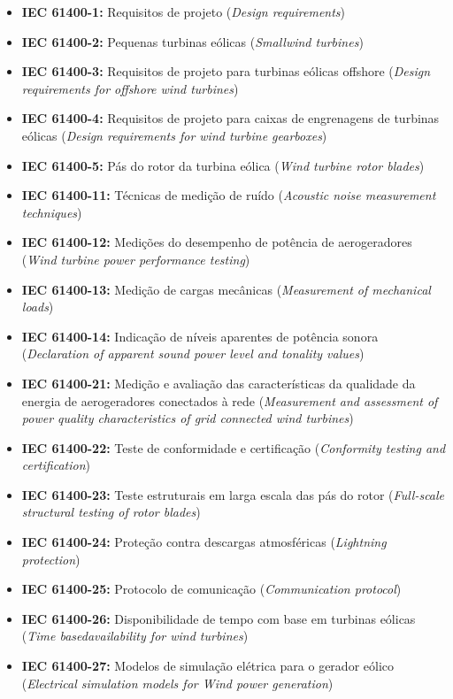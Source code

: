 \begin{itemize}
    \item \textbf{IEC 61400-1:} Requisitos de projeto (\textit{Design requirements})
    \item \textbf{IEC 61400-2:} Pequenas turbinas eólicas (\textit{Smallwind turbines})
    \item \textbf{IEC 61400-3:} Requisitos de projeto para turbinas eólicas offshore (\textit{Design requirements for offshore wind turbines})
    \item \textbf{IEC 61400-4:} Requisitos de projeto para caixas de engrenagens de turbinas eólicas (\textit{Design requirements for wind turbine gearboxes})
    \item \textbf{IEC 61400-5:} Pás do rotor da turbina eólica (\textit{Wind turbine rotor blades})
    \item \textbf{IEC 61400-11:} Técnicas de medição de ruído (\textit{Acoustic noise measurement techniques})
    \item \textbf{IEC 61400-12:} Medições do desempenho de potência de aerogeradores (\textit{Wind turbine power performance testing})
    \item \textbf{IEC 61400-13:} Medição de cargas mecânicas (\textit{Measurement of mechanical
loads})
    \item \textbf{IEC 61400-14:} Indicação de níveis aparentes de potência sonora (\textit{Declaration of apparent sound power level and tonality values})
    \item \textbf{IEC 61400-21:} Medição e avaliação das características da qualidade da energia de aerogeradores conectados à rede (\textit{Measurement and assessment of power quality characteristics of grid connected wind turbines})
    \item \textbf{IEC 61400-22:} Teste de conformidade e certificação (\textit{Conformity testing and certification})
    \item \textbf{IEC 61400-23:} Teste estruturais em larga escala das pás do rotor (\textit{Full-scale structural testing of rotor blades})
    \item \textbf{IEC 61400-24:} Proteção contra descargas atmosféricas (\textit{Lightning protection})
    \item \textbf{IEC 61400-25:} Protocolo de comunicação (\textit{Communication protocol})
    \item \textbf{IEC 61400-26:} Disponibilidade de tempo com base em turbinas eólicas (\textit{Time basedavailability for wind turbines})
    \item \textbf{IEC 61400-27:} Modelos de simulação elétrica para o gerador eólico (\textit{Electrical simulation models for Wind power generation})
\end{itemize}

